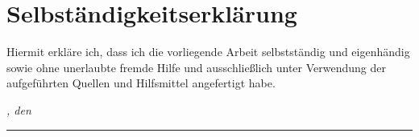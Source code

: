 %
\chapter*{Selbständigkeitserklärung}
\label{sec:declaration}
\thispagestyle{empty}

Hiermit erkläre ich, dass ich die vorliegende Arbeit selbstständig und eigenhändig sowie ohne
unerlaubte fremde Hilfe und ausschließlich unter Verwendung der aufgeführten Quellen und
Hilfsmittel angefertigt habe.

\bigskip

\noindent\textit{\thesisUniversityCity, den \thesisDateGerman}

\smallskip

\begin{flushright}
	\begin{minipage}{5cm}
		\rule{\textwidth}{1pt}
		\centering\thesisName
	\end{minipage}
\end{flushright}

